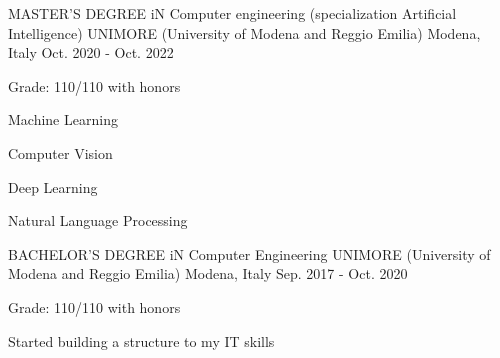 

\begin{cventries}

  \cventry
    {MASTER’S DEGREE iN Computer engineering (specialization Artificial Intelligence)} %
    {UNIMORE (University of Modena and Reggio Emilia)} %
    {Modena, Italy} %
    {Oct. 2020 - Oct. 2022} %
    {
    \begin{cvitems}%
        \item {Grade: 110/110 with honors}
        \item {Machine Learning}
        \item {Computer Vision}
        \item {Deep Learning}
        \item {Natural Language Processing}
      \end{cvitems}
      }
  \cventry
    {BACHELOR’S DEGREE iN Computer Engineering} %
    {UNIMORE (University of Modena and Reggio Emilia)} %
    {Modena, Italy} %
    {Sep. 2017 - Oct. 2020} %
    {
      \begin{cvitems} %
      \item {Grade: 110/110 with honors}
        \item {Started building a structure to my IT skills}
      \end{cvitems}
    }


\end{cventries}

